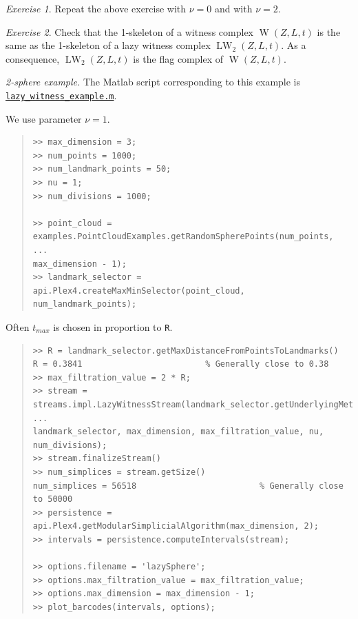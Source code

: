 \documentclass[amscd, amssymb, verbatim]{amsart}[12pt]
\theoremstyle{remark}
\newtheorem{exercise}{Exercise}
\theoremstyle{remark}
\theoremstyle{remark}
\DeclareMathOperator{\W}{W}
\DeclareMathOperator{\LW}{LW}
\begin{document}
\begin{exercise}
Repeat the above exercise with $\nu = 0$ and with $\nu = 2$. 
\end{exercise}

\begin{exercise}
Check that the 1-skeleton of a witness complex $\W(Z,L,t)$ is the same as the 1-skeleton of a lazy witness complex $\LW_2(Z,L,t)$. As a consequence, $\LW_2(Z,L,t)$ is the flag complex of $\W(Z,L,t)$. 
\end{exercise}

{\em 2-sphere example.} The Matlab script corresponding to this example is \href{https://github.com/appliedtopology/javaplex/tree/master/src/matlab/for_distribution/tutorial_examples/lazy_witness_example.m}{\texttt{lazy\_witness\_example.m}}.

We use parameter $\nu = 1$.

\begin{quote} \begin{verbatim}
>> max_dimension = 3;
>> num_points = 1000;
>> num_landmark_points = 50;
>> nu = 1;
>> num_divisions = 1000;

>> point_cloud = examples.PointCloudExamples.getRandomSpherePoints(num_points, ...
max_dimension - 1);
>> landmark_selector = api.Plex4.createMaxMinSelector(point_cloud, num_landmark_points); 
\end{verbatim} \end{quote}

Often $t_{max}$ is chosen in proportion to \texttt{R}. 

\begin{quote} \begin{verbatim} 
>> R = landmark_selector.getMaxDistanceFromPointsToLandmarks()
R = 0.3841                         % Generally close to 0.38
>> max_filtration_value = 2 * R;
>> stream = streams.impl.LazyWitnessStream(landmark_selector.getUnderlyingMetricSpace(), ...
landmark_selector, max_dimension, max_filtration_value, nu, num_divisions); 
>> stream.finalizeStream()
>> num_simplices = stream.getSize()
num_simplices = 56518                         % Generally close to 50000
>> persistence = api.Plex4.getModularSimplicialAlgorithm(max_dimension, 2);
>> intervals = persistence.computeIntervals(stream);

>> options.filename = 'lazySphere';
>> options.max_filtration_value = max_filtration_value;
>> options.max_dimension = max_dimension - 1;
>> plot_barcodes(intervals, options);
\end{verbatim} \end{quote}
\end{document}
